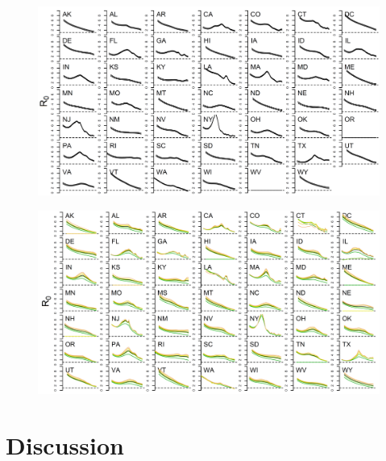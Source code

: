 \documentclass[11pt]{article}
\begin{document}
\begin{figure}
\centering
\hspace*{0cm}\includegraphics[width=18cm]{beta_AR1_fits_R0.png}
\caption{}
\label{fig:bends}
\end{figure} 
\begin{figure}


\centering
\hspace*{0cm}\includegraphics[width=18cm]{beta_AR1_fits_R0_ps_sensitivity.png}
\caption{}
\label{fig:bends}
\end{figure} 
\section*{Discussion}

%

\end{document}
